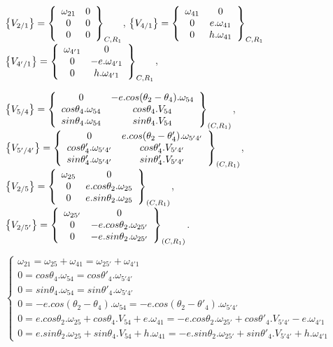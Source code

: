 $\left\{V_{2/1}\right\}=\left\{\begin{array}{c c} \omega_{21} & 0 \\ 0 & 0 \\ 0 & 0
\end{array}\right\}_{C,R_1}$,
$\left\{V_{4/1}\right\}=\left\{\begin{array}{c c} \omega_{41} & 0 \\ 0 & e.\omega_{41} \\ 0 & h.\omega_{41} 
\end{array}\right\}_{C,R_1}$\\
$\left\{V_{4'/1}\right\}=\left\{\begin{array}{c c} \omega_{4'1} & 0 \\ 0 & -e.\omega_{4'1} \\ 0 & h.\omega_{4'1} 
\end{array}\right\}_{C,R_1}$,

$\left\{V_{5/4}\right\}=\left\{\begin{array}{c c} 0 & -e.cos(\theta_2-\theta_4).\omega_{54} \\ cos\theta_4.\omega_{54} & cos\theta_4.V_{54} \\ sin\theta_4.\omega_{54} & sin\theta_4.V_{54} \end{array}\right\}_{(C,R_1)}$,
$\left\{V_{5'/4'}\right\}=\left\{\begin{array}{c c} 0 & e.cos(\theta_2-\theta'_4).\omega_{5'4'} \\ cos\theta'_4.\omega_{5'4'} & cos\theta'_4.V_{5'4'} \\ sin\theta'_4.\omega_{5'4'} & sin\theta'_4.V_{5'4'} \end{array}\right\}_{(C,R_1)}$,
$\left\{V_{2/5}\right\}=\left\{\begin{array}{c c} \omega_{25} & 0 \\ 0 & e.cos\theta_2.\omega_{25} \\ 0 & e.sin\theta_2.\omega_{25}\end{array}\right\}_{(C,R_1)}$,
$\left\{V_{2/5'}\right\}=\left\{\begin{array}{c c} \omega_{25'} & 0 \\ 0 & -e.cos\theta_2.\omega_{25'} \\ 0 & -e.sin\theta_2.\omega_{25'}\end{array}\right\}_{(C,R_1)}$.

$\left\{\begin{array}{l} \omega_{21}=\omega_{25}+\omega_{41}=\omega_{25'}+\omega_{4'1} \\
0=cos\theta_4.\omega_{54}=cos\theta'_4.\omega_{5'4'} \\ 0=sin\theta_4.\omega_{54}=sin\theta'_4.\omega_{5'4'} \\ 0=-e.cos(\theta_2-\theta_4).\omega_{54}=-e.cos(\theta_2-\theta'_4).\omega_{5'4'} \\ 0=e.cos\theta_2.\omega_{25}+cos\theta_4.V_{54}+e.\omega_{41}=-e.cos\theta_2.\omega_{25'}+cos\theta'_4.V_{5'4'}-e.\omega_{4'1} \\ 0=e.sin\theta_2.\omega_{25}+sin\theta_4.V_{54}+h.\omega_{41}=-e.sin\theta_2.\omega_{25'}+sin\theta'_4.V_{5'4'}+h.\omega_{4'1}
\end{array}\right.$

